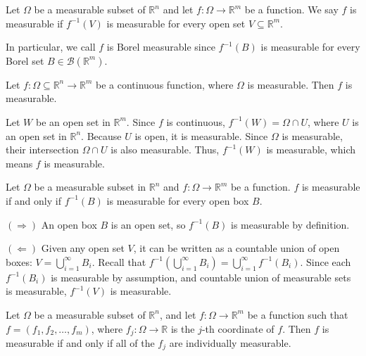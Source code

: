 \begin{definition}
    Let $\Omega$ be a measurable subset of $\mathbb{R}^n$ and let $f:\Omega\rightarrow \mathbb{R}^m$ be a function. We say $f$ is measurable if $f^{-1}(V)$ is measurable for every open set $V \subseteq \mathbb{R}^m$.
\end{definition}

\begin{remark}
    In particular, we call $f$ is Borel measurable since $f^{-1}(B)$ is measurable for every Borel set $B \in \mathcal{B}(\mathbb{R}^m).$
\end{remark}



\begin{theorem}
    Let $f: \Omega \subseteq \mathbb{R}^n \rightarrow \mathbb{R}^m$ be a continuous function, where $\Omega$ is measurable. Then $f$ is measurable.
\end{theorem}

\begin{pfbox}
    Let $W$ be an open set in $\mathbb{R}^m$. Since $f$ is continuous, $f^{-1}(W) = \Omega \cap U$, where $U$ is an open set in $\mathbb{R}^n$. Because $U$ is open, it is measurable. Since $\Omega$ is measurable, their intersection $\Omega \cap U$ is also measurable. Thus, $f^{-1}(W)$ is measurable, which means $f$ is measurable.
\end{pfbox}

\begin{theorem}
    Let $\Omega$ be a measurable subset in $\mathbb{R}^n$ and $f: \Omega \rightarrow \mathbb{R}^m$ be a function. $f$ is measurable if and only if $f^{-1}(B)$ is measurable for every open box $B$.
\end{theorem}

\begin{pfbox}
    $(\Rightarrow)$ An open box $B$ is an open set, so $f^{-1}(B)$ is measurable by definition.
    
    $(\Leftarrow)$ Given any open set $V$, it can be written as a countable union of open boxes: $V = \bigcup_{i=1}^\infty B_i$. Recall that $f^{-1}\left(\bigcup_{i=1}^\infty B_i\right) = \bigcup_{i=1}^\infty f^{-1}(B_i)$. Since each $f^{-1}(B_i)$ is measurable by assumption, and countable union of measurable sets is measurable, $f^{-1}(V)$ is measurable.
\end{pfbox}

\begin{corollary}
    Let $\Omega$ be a measurable subset of $\mathbb{R}^n$, and let $f:\Omega\rightarrow \mathbb{R}^m$ be a function such that $f = (f_1, f_2, \dots, f_m)$, where $f_j:\Omega\rightarrow \mathbb{R}$ is the $j$-th coordinate of $f$. Then $f$ is measurable if and only if all of the $f_j$ are individually measurable.
\label{coordinatewise measurable}
\end{corollary}

